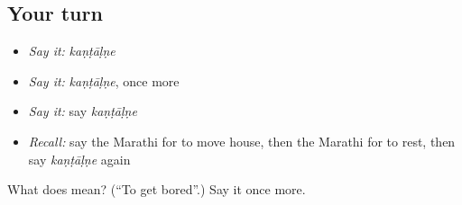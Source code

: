 \subsection*{Your turn}
\begin{itemize}
\raggedright
  \item \emph{Say it:} \emph{kaṇṭāḷṇe}
  \item \emph{Say it:} \emph{kaṇṭāḷṇe}, once more
  \item \emph{Say it:} say \emph{kaṇṭāḷṇe}
  \item \emph{Recall:} say the Marathi for to move house, then the Marathi for to rest, then say \emph{kaṇṭāḷṇe} again
\end{itemize}

\begin{tcolorbox}[breakable,colback=teal!4,colframe=teal!35!black,title={Before you move on}]
What does  mean? (\textquotedblleft{}To get bored\textquotedblright{}.) Say it once more.
\end{tcolorbox}
